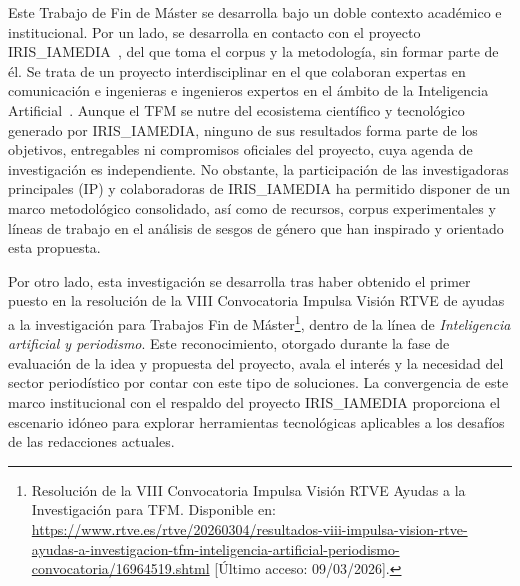 
Este Trabajo de Fin de Máster se desarrolla bajo un doble contexto académico e institucional. Por un lado, se desarrolla en contacto con el proyecto IRIS\_IAMEDIA~\cite{irisiamedia}, del que toma el corpus y la metodología, sin formar parte de él. Se trata de un proyecto interdisciplinar en el que colaboran expertas en comunicación e ingenieras e ingenieros expertos en el ámbito de la Inteligencia Artificial~\cite{avi2026}. Aunque el TFM se nutre del ecosistema científico y tecnológico generado por IRIS\_IAMEDIA, ninguno de sus resultados forma parte de los objetivos, entregables ni compromisos oficiales del proyecto, cuya agenda de investigación es independiente. No obstante, la participación de las investigadoras principales (IP) y colaboradoras de IRIS\_IAMEDIA ha permitido disponer de un marco metodológico consolidado, así como de recursos, corpus experimentales y líneas de trabajo en el análisis de sesgos de género que han inspirado y orientado esta propuesta.

Por otro lado, esta investigación se desarrolla tras haber obtenido el primer puesto en la resolución de la VIII Convocatoria Impulsa Visión RTVE de ayudas a la investigación para Trabajos Fin de Máster\footnote{Resolución de la VIII Convocatoria Impulsa Visión RTVE Ayudas a la Investigación para TFM. Disponible en: \url{https://www.rtve.es/rtve/20260304/resultados-viii-impulsa-vision-rtve-ayudas-a-investigacion-tfm-inteligencia-artificial-periodismo-convocatoria/16964519.shtml} [Último acceso: 09/03/2026].}, dentro de la línea de \textit{Inteligencia artificial y periodismo}. Este reconocimiento, otorgado durante la fase de evaluación de la idea y propuesta del proyecto, avala el interés y la necesidad del sector periodístico por contar con este tipo de soluciones. La convergencia de este marco institucional con el respaldo del proyecto IRIS\_IAMEDIA proporciona el escenario idóneo para explorar herramientas tecnológicas aplicables a los desafíos de las redacciones actuales.
